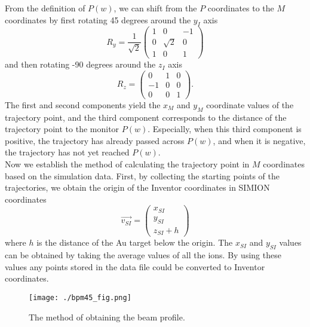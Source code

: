 \documentclass{article}
\begin{document}
From the definition of $P(w)$, we can shift from the $P$ coordinates to the $M$ coordinates by first rotating 45 degrees around the $y_I$ axis
\begin{equation*}
R_y = \frac{1}{\sqrt{2}} \left(
\begin{array}{ccc}
	1 & 0 & -1 \\
	0 & \sqrt{2} & 0 \\
	1 & 0 & 1
\end{array} \right)
\end{equation*}
and then rotating -90 degrees around the $z_I$ axis
\begin{equation*}
R_z = \left(
\begin{array}{ccc}
	0 & 1 & 0 \\
	-1 & 0 & 0 \\
	0 & 0 & 1
\end{array} \right).
\end{equation*}
The first and second components yield the $x_M$ and $y_M$ coordinate values of the trajectory point, and the third component corresponds to the distance of the trajectory point to the monitor $P(w)$. Especially, when this third component is positive, the trajectory has already passed across $P(w)$, and when it is negative, the trajectory has not yet reached $P(w)$. \\

Now we establish the method of calculating the trajectory point in $M$ coordinates based on the simulation data. First, by collecting the starting points of the trajectories, we obtain the origin of the Inventor coordinates in SIMION coordinates
\begin{equation*}
\vec{v_{SI}} = \left(
\begin{array}{c}
	x_{SI} \\
	y_{SI} \\
	z_{SI} + h
\end{array} \right)
\end{equation*}
where $h$ is the distance of the Au target below the origin. The $x_{SI}$ and $y_{SI}$ values can be obtained by taking the average values of all the ions. By using these values any points stored in the data file could be converted to Inventor coordinates. \\

\begin{figure}[H]
  \begin{center}
    \texttt{[image: ./bpm45\_fig.png]}
    \caption{The method of obtaining the beam profile.}
    \label{fig:bpm45_fig}
  \end{center}
\end{figure}
\end{document}
